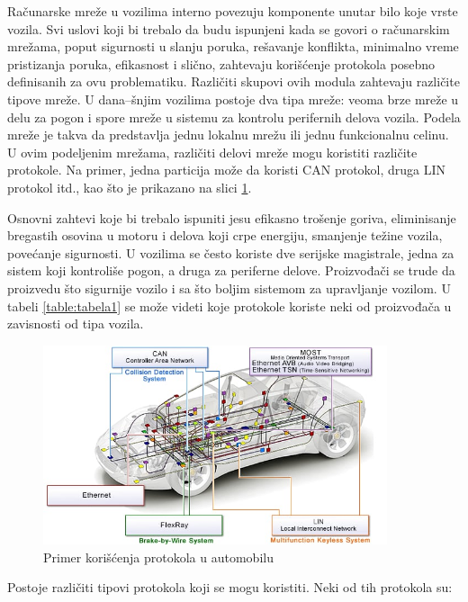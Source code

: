 \documentclass[a4paper]{article}
\begin{document}
Računarske mreže u vozilima interno povezuju komponente unutar bilo koje vrste vozila. Svi uslovi koji bi trebalo da budu ispunjeni kada se govori o računarskim mrežama, poput sigurnosti u slanju poruka, rešavanje konflikta, minimalno vreme pristizanja poruka, efikasnost i slično, zahtevaju korišćenje protokola posebno definisanih za ovu problematiku. Različiti skupovi ovih modula zahtevaju različite tipove mreže. U dana--šnjim vozilima postoje dva tipa mreže: veoma brze mreže u delu za pogon i spore mreže u sistemu za kontrolu perifernih delova vozila. Podela mreže je takva da predstavlja jednu lokalnu mrežu ili jednu funkcionalnu celinu. U ovim podeljenim mrežama, različiti delovi mreže mogu koristiti različite protokole. Na primer, jedna particija može da koristi CAN protokol, druga LIN protokol itd., kao što je prikazano na slici \ref{fig:protokoliprimer}.

Osnovni zahtevi koje bi trebalo ispuniti jesu efikasno trošenje goriva, eliminisanje bregastih osovina u motoru i delova koji crpe energiju, smanjenje težine vozila, povećanje sigurnosti. U vozilima se često koriste dve serijske magistrale, jedna za sistem koji kontroliše pogon, a druga za periferne delove. Proizvođači se trude da proizvedu što sigurnije vozilo i sa što boljim sistemom za upravljanje vozilom. U tabeli \ref{table:tabela1} se može videti koje protokole koriste neki od proizvođača u zavisnosti od tipa vozila.

\begin{figure}[h]
\centering
 \includegraphics[width=0.9\textwidth]{protokoliprimer}
 \caption{Primer korišćenja protokola u automobilu}
 \label{fig:protokoliprimer}
\end{figure}


Postoje različiti tipovi protokola \cite{viseujednom} koji se mogu koristiti. Neki od tih protokola su:
\end{document}
